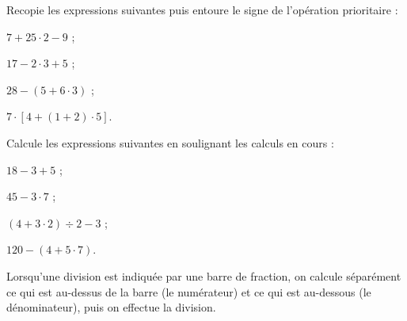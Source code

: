 \begin{methode*1}


\exercice 
Recopie les expressions suivantes puis entoure le signe de l'opération prioritaire :
\begin{colenumerate}{2}
 \item $7 + 25 \cdot 2 - 9$ ;
 \item $17 - 2 \cdot 3 + 5$ ;
 \item $28 - (5 + 6 \cdot 3)$ ;
 \item $7 \cdot [4  + (1 + 2) \cdot 5]$.
 \end{colenumerate}
 
 \exercice 
Calcule les expressions suivantes en soulignant les calculs en cours :
\begin{colenumerate}{2}
 \item $18 - 3 + 5$ ;
 \item $45 - 3 \cdot 7$ ;
 \item $(4 + 3 \cdot 2) \div 2 - 3$ ;
 \item $120 - (4 + 5 \cdot 7)$.
 \end{colenumerate}


\end{methode*1}


\begin{aconnaitre}
Lorsqu’une division est indiquée par une barre de fraction, on calcule séparément ce qui est au-dessus de la barre (le numérateur) et ce qui est au-dessous (le dénominateur), puis on effectue la division.
\end{aconnaitre}



